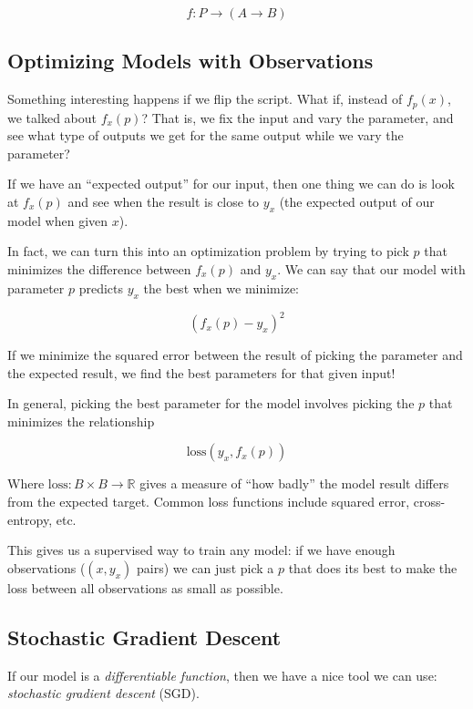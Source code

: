\documentclass[]{article}
\begin{document}
\[
f : P \rightarrow (A \rightarrow B)
\]

\hypertarget{optimizing-models-with-observations}{%
\subsection{Optimizing Models with
Observations}\label{optimizing-models-with-observations}}

Something interesting happens if we flip the script. What if, instead of
\(f_p(x)\), we talked about \(f_x(p)\)? That is, we fix the input and vary the
parameter, and see what type of outputs we get for the same output while we vary
the parameter?

If we have an ``expected output'' for our input, then one thing we can do is
look at \(f_x(p)\) and see when the result is close to \(y_x\) (the expected
output of our model when given \(x\)).

In fact, we can turn this into an optimization problem by trying to pick \(p\)
that minimizes the difference between \(f_x(p)\) and \(y_x\). We can say that
our model with parameter \(p\) predicts \(y_x\) the best when we minimize:

\[
(f_x(p) - y_x)^2
\]

If we minimize the squared error between the result of picking the parameter and
the expected result, we find the best parameters for that given input!

In general, picking the best parameter for the model involves picking the \(p\)
that minimizes the relationship

\[
\text{loss}(y_x, f_x(p))
\]

Where \(\text{loss} : B \times B \rightarrow \mathbb{R}\) gives a measure of
``how badly'' the model result differs from the expected target. Common loss
functions include squared error, cross-entropy, etc.

This gives us a supervised way to train any model: if we have enough
observations (\((x, y_x)\) pairs) we can just pick a \(p\) that does its best to
make the loss between all observations as small as possible.

\hypertarget{stochastic-gradient-descent}{%
\subsection{Stochastic Gradient Descent}\label{stochastic-gradient-descent}}

If our model is a \emph{differentiable function}, then we have a nice tool we
can use: \emph{stochastic gradient descent} (SGD).
\end{document}
